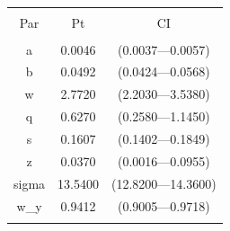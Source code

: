 
\begin{table}[!htbp] \centering 
  \caption{} 
  \label{} 
\begin{tabular}{@{\extracolsep{5pt}} ccc} 
\\[-1.8ex]\hline 
\hline \\[-1.8ex] 
Par & Pt & CI \\ 
\hline \\[-1.8ex] 
a & 0.0046 & (0.0037---0.0057) \\ 
b & 0.0492 & (0.0424---0.0568) \\ 
w & 2.7720 & (2.2030---3.5380) \\ 
q & 0.6270 & (0.2580---1.1450) \\ 
s & 0.1607 & (0.1402---0.1849) \\ 
z & 0.0370 & (0.0016---0.0955) \\ 
sigma & 13.5400 & (12.8200---14.3600) \\ 
w\_y & 0.9412 & (0.9005---0.9718) \\ 
\hline \\[-1.8ex] 
\end{tabular} 
\end{table} 
